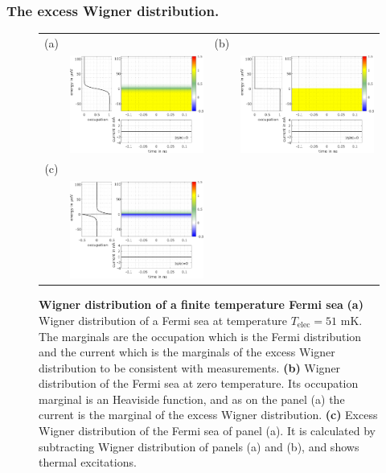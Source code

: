 \subsubsection*{The excess Wigner distribution.}

\begin{figure}[hptb]
	\begin{center}
		\begin{tabular}{c c c c}
			(a) & & (b) &\\
			& \includegraphics[width = 6.5cm]{./chap1/wig_finite_temp_fermi_sea}&
			& \includegraphics[width = 6.5cm]{./chap1/wig_zero_temp_fermi_sea} \\
			(c) & & & \\ 
			& \includegraphics[width = 6.5cm]{./chap1/excess_wig_finite_temp_fermi_sea}&
		\end{tabular} 
	\end{center}
	\caption{\textbf{Wigner distribution of a finite temperature Fermi sea} \textbf{(a)} Wigner distribution of a Fermi sea at temperature $T_{\mathrm{elec}} = 51$ mK. The marginals are the occupation which is the Fermi distribution and the current which is the marginals of the excess Wigner distribution to be consistent with measurements. \textbf{(b)} Wigner distribution of the Fermi sea at zero temperature. Its occupation marginal is an Heaviside function, and as on the panel (a) the current is the marginal of the excess Wigner distribution. \textbf{(c)} Excess Wigner distribution of the Fermi sea of panel (a). It is calculated by subtracting Wigner distribution of panels (a) and (b), and shows thermal excitations.}
	\label{fig: Wigner Fermi sea}
\end{figure}


